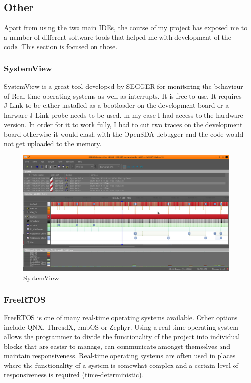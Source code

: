 \documentclass[12pt,a4paper]{article}
\begin{document}
		\newpage
		
		
		\subsection{Other}
		Apart from using the two main IDEs, the course of my project has exposed me to a number of different software tools that helped me with development of the code. This section is focused on those.
		
            \subsubsection{SystemView}
            SystemView is a great tool developed by SEGGER for monitoring the behaviour of Real-time operating systems as well as interrupts. It is free to use. It requires J-Link to be either installed as a bootloader on the development board or a harware J-Link probe needs to be used. In my case I had access to the hardware version. In order for it to work fully, I had to cut two traces on the development board otherwise it would clash with the OpenSDA debugger and the code would not get uploaded to the memory.
                    
            \begin{figure}[h]
                \centering
                \includegraphics[width=\textwidth]{systemview1}
                \caption{SystemView}
            \end{figure}
        
            \subsubsection{FreeRTOS}
            FreeRTOS is one of many real-time operating systems available. Other options include QNX, 
            ThreadX, embOS or Zephyr. Using a real-time operating system allows the programmer to 
            divide the functionality of the project into individual blocks that are easier to manage, 
            can communicate amongst themselves and maintain responsiveness. Real-time operating
            systems are often used in places where the functionality of a system is somewhat complex and a certain level of responsiveness is required (time-deterministic).
            
\end{document}
